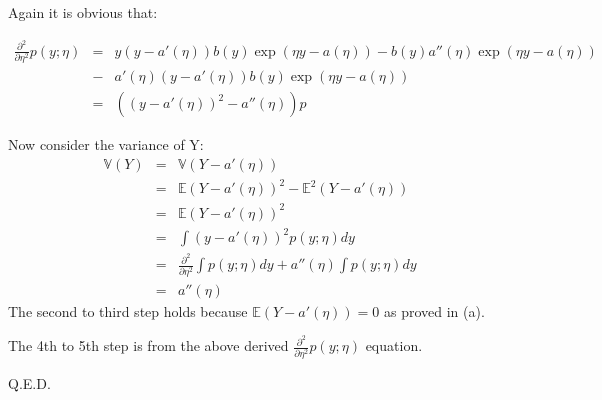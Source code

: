 \begin{answer}

Again it is obvious that:

\begin{eqnarray*}
\frac{\partial^2}{\partial \eta^2} p(y;\eta)
    &=& y(y-a'(\eta)) b(y) \exp(\eta y-a(\eta))-b(y)a''(\eta)\exp(\eta y-a(\eta)) \\
    &-& a'(\eta)(y-a'(\eta))b(y)\exp(\eta y -a(\eta)) \\
    &=& ((y-a'(\eta))^2-a''(\eta))p
\end{eqnarray*}

Now consider the variance of Y:
\begin{eqnarray*}
\mathbb{V}(Y)
    &=& \mathbb{V}(Y-a'(\eta)) \\
    &=& \mathbb{E}(Y-a'(\eta))^2 - \mathbb{E}^2(Y-a'(\eta)) \\
    &=& \mathbb{E}(Y-a'(\eta))^2 \\
    &=& \int (y-a'(\eta))^2 p(y;\eta)dy \\
    &=& \frac{\partial^2}{\partial \eta^2} \int p(y;\eta)dy + a''(\eta) \int p(y;\eta)dy \\
    &=& a''(\eta)
\end{eqnarray*}
The second to third step holds because $\mathbb{E}(Y-a'(\eta)) = 0$ as proved in (a).

The 4th to 5th step is from the above derived $\frac{\partial^2}{\partial \eta^2} p(y;\eta)$ equation.

Q.E.D.

\end{answer}

